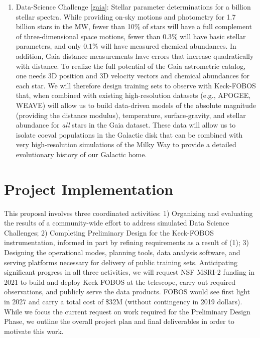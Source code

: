 \documentclass[oneside,11pt]{amsart}
\newcounter{chalno}
\newcommand{\chal}[1]{\refstepcounter{chalno}\label{#1}}
\begin{document}
\begin{enumerate}[rightmargin=0.2cm,leftmargin=0.2cm]
\chal{gaia} 
%
\item[] {\textsf {\large Data-Science Challenge \ref{gaia}: Stellar
parameter determinations for a billion stellar spectra.}} While
providing on-sky motions and photometry for 1.7 billion stars in the MW,
fewer than 10\% of stars will have a full complement of
three-dimensional space motions, fewer than 0.3\% will have basic
stellar parameters, and only 0.1\% will have measured chemical
abundances.  In addition, Gaia distance measurements have errors that
increase quadratically with distance.  To realize the full potential of
the Gaia astrometric catalog, one needs 3D position and 3D velocity
vectors and chemical abundances for each star.  We will therefore design
training sets to observe with Keck-FOBOS that, when combined with
existing high-resolution datasets (e.g., APOGEE, WEAVE) will allow us to
build data-driven models of the absolute magnitude (providing the
distance modulus), temperature, surface-gravity, and stellar abundance
for {\it all} stars in the Gaia dataset.  These data will allow us to
isolate coeval populations in the Galactic disk that can be combined
with very high-resolution simulations of the Milky Way to provide a
detailed evolutionary history of our Galactic home.

\end{enumerate}

\section{Project Implementation}
\label{sec:project}

This proposal involves three coordinated activities: 1) Organizing and evaluating the results of a community-wide
effort to address simulated Data Science Challenges; 2) Completing Preliminary Design for the Keck-FOBOS
instrumentation, informed in part by refining requirements as a result of (1); 3) Designing the operational modes,
planning tools, data analysis software, and serving platforms necessary for delivery of public training sets.
Anticipating significant progress in all three activities, we will request NSF MSRI-2 funding in 2021 to build and
deploy Keck-FOBOS at the telescope, carry out required observations, and publicly serve the data products.  FOBOS would
see first light in 2027 and carry a total cost of \$32M (without contingency in 2019 dollars).  While we focus the
current request on work required for the Preliminary Design Phase, we outline the overall project plan and final
deliverables in order to motivate this work.
\end{document}
